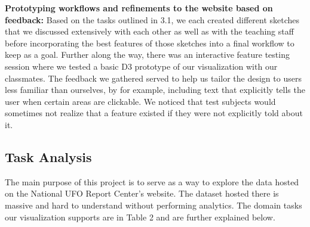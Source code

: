 \documentclass[journal]{vgtc}                %
\begin{document}
\textbf{Prototyping workflows and refinements to the website based on feedback:} Based on the tasks outlined in 3.1, we each created different sketches that we discussed extensively with each other as well as with the teaching staff before incorporating the best features of those sketches into a final workflow to keep as a goal.  Further along the way, there was an interactive feature testing session where we tested a basic D3 prototype of our visualization with our classmates. The feedback we gathered served to help us tailor the design to users less familiar than ourselves, by for example, including text that explicitly tells the user when certain areas are clickable. We noticed that test subjects would sometimes not realize that a feature existed if they were not explicitly told about it.


\subsection{Task Analysis}
The main purpose of this project is to serve as a way to explore the data hosted on the National UFO Report Center's website. The dataset hosted there is massive and hard to understand without performing analytics. The domain tasks our visualization supports are in Table 2 and are further explained below.
\end{document}
